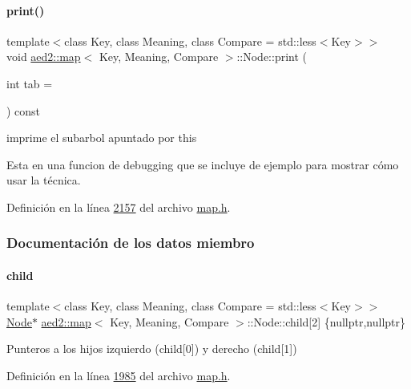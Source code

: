 \paragraph{\texorpdfstring{print()}{print()}}
{\footnotesize\ttfamily template$<$class Key, class Meaning, class Compare = std\+::less$<$\+Key$>$$>$ \\
void \hyperlink{classaed2_1_1map}{aed2\+::map}$<$ Key, Meaning, Compare $>$\+::Node\+::print (\begin{DoxyParamCaption}\item[{int}]{tab = {} }\end{DoxyParamCaption}) const\hspace{0.3cm}{\ttfamily [inline]}}



imprime el subarbol apuntado por this 

Esta en una funcion de debugging que se incluye de ejemplo para mostrar cómo usar la técnica. 

Definición en la línea \hyperlink{map_8h_source_l02157}{2157} del archivo \hyperlink{map_8h_source}{map.\+h}.



\subsubsection{Documentación de los datos miembro}
\mbox{\label{structaed2_1_1map_1_1Node_a7d65c374c73c443a46d8fc224aff9e82_a7d65c374c73c443a46d8fc224aff9e82}} 
\paragraph{\texorpdfstring{child}{child}}
{\footnotesize\ttfamily template$<$class Key, class Meaning, class Compare = std\+::less$<$\+Key$>$$>$ \\
\hyperlink{structaed2_1_1map_1_1Node}{Node}$\ast$ \hyperlink{classaed2_1_1map}{aed2\+::map}$<$ Key, Meaning, Compare $>$\+::Node\+::child\mbox{[}2\mbox{]} \{nullptr,nullptr\}}



Punteros a los hijos izquierdo (child\mbox{[}0\mbox{]}) y derecho (child\mbox{[}1\mbox{]}) 



Definición en la línea \hyperlink{map_8h_source_l01985}{1985} del archivo \hyperlink{map_8h_source}{map.\+h}.

